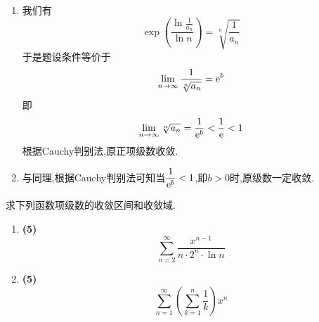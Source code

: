 \documentclass{ctexart}
\begin{document}
\begin{solution}
    \begin{enumerate}[label=\tbf{(\arabic*)},topsep=0pt,parsep=0pt,itemsep=0pt,partopsep=0pt]
        \item 我们有
            \[\exp\left(\dfrac{\ln\frac{1}{a_n}}{\ln n}\right)=\sqrt[n]{\dfrac{1}{a_n}}\]
            于是题设条件等价于
            \[\lim_{n\to\infty}\dfrac{1}{\sqrt[n]{a_n}}=\mathrm{e}^b\]
            即
            \[\lim_{n\to\infty}\sqrt[n]{a_n}=\dfrac{1}{\mathrm{e}^b}<\dfrac{1}{\mathrm{e}}<1\]
            根据Cauchy判别法,原正项级数收敛.
        \item 与同理,根据Cauchy判别法可知当$\dfrac{1}{\mathrm{e}^b}<1$,即$b>0$时,原级数一定收敛.

    \end{enumerate}
\end{solution}
\begin{problem}[4.(10\songti{分})]
    求下列函数项级数的收敛区间和收敛域.
    \begin{enumerate}[label=\tbf{(\arabic*)},topsep=0pt,parsep=0pt,itemsep=0pt,partopsep=0pt]
        \item \textbf{(5)}\ 
            \[\sum_{n=2}^{\infty}\dfrac{x^{n-1}}{n\cdot2^n\cdot\ln n}\]
        \item \textbf{(5\songti{分})}\ 
            \[\sum_{n=1}^{\infty}\left(\sum_{k=1}^{n}\dfrac{1}{k}\right)x^n\]

    \end{enumerate}
\end{problem}
\end{document}
